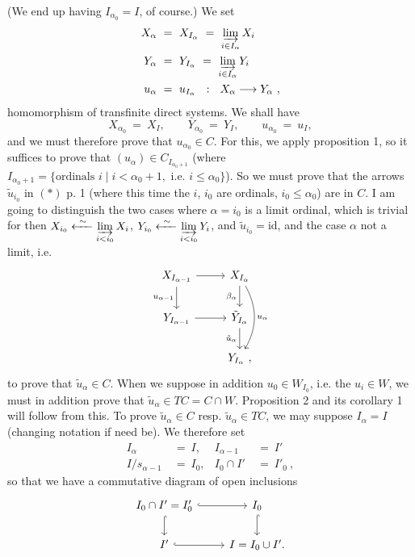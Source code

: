 \documentclass[11pt]{article}
\newcommand{\printedpage}[1]{\marginpar{\footnotesize p.~#1}}
\newcommand{\msp}[1]{\marginpar{\footnotesize [#1]}}
\begin{document}
\msp{page 12}

(We end up having $I_{\alpha_0} = I$, of course.) We set
\[
\begin{aligned}
X_{\alpha} \ &= \ X_{I_{\alpha}} \ = \ \varinjlim_{i \in I_{\alpha}} X_i \\
Y_{\alpha} \ &= \ Y_{I_{\alpha}} \ = \ \varinjlim_{i \in I_{\alpha}} Y_i \\
u_{\alpha} \ &= \ u_{I_{\alpha}} \ \ :\ \ X_{\alpha} \longrightarrow Y_{\alpha}\ ,
\end{aligned}
\]
homomorphism of transfinite direct systems. We shall have
\[
X_{\alpha_0} \ = \ X_I, \qquad Y_{\alpha_0} \ = \ Y_I, \qquad u_{\alpha_0} \ = \ u_I,
\]
and we must therefore prove that $u_{\alpha_0} \in C$. For this, we apply proposition 1, so it suffices to prove that $(u_{\alpha}) \in C_{I_{\alpha_0+1}}$ (where $I_{\alpha_0+1} = \{\text{ordinals } i \mid i < \alpha_0 + 1, \text{ i.e. } i \leq \alpha_0\}$). So we must prove that the arrows $\tilde{u}_{i_0}$ in $(*)$ p. 1 (where this time the $i$, $i_0$ are ordinals, $i_0 \leq \alpha_0$) are in $C$. I am going to distinguish the two cases where $\alpha = i_0$ is a limit ordinal, which is trivial for then $X_{i_0} \xleftarrow{\ \sim\ } \varinjlim\limits_{i < i_0} X_i$, $Y_{i_0} \xleftarrow{\ \sim\ } \varinjlim\limits_{i < i_0} Y_i$, and $\tilde{u}_{i_0} = \mathrm{id}$, and the case $\alpha$ not a limit, i.e.
\[
\begin{tikzcd}
X_{I_{\alpha-1}} \arrow[r] \arrow[d, "u_{\alpha-1}"'] & X_{I_{\alpha}} \arrow[d, "\beta_{\alpha}"'] \arrow[dd, bend left=30, "u_{\alpha}"] \\
Y_{I_{\alpha-1}} \arrow[r] & \tilde{Y}_{I_{\alpha}} \arrow[d, "\tilde{u}_{\alpha}"'] \\
& Y_{I_{\alpha}}\ ,
\end{tikzcd}
\]
\printedpage{8}
\msp{page 13}
to prove that $\tilde{u}_{\alpha} \in C$. When we suppose in addition $u_0 \in W_{I_0}$, i.e. the $u_i \in W$, we must in addition prove that $\tilde{u}_{\alpha} \in TC = C \cap W$. Proposition 2 and its corollary 1 will follow from this. To prove $\tilde{u}_{\alpha} \in C$ resp. $\tilde{u}_{\alpha} \in TC$, we may suppose $I_{\alpha} = I$ (changing notation if need be). We therefore set
\[
\begin{aligned}
I_{\alpha} \ &= \ I, & I_{\alpha-1} \ &= \ I' \\
I/s_{\alpha-1} \ &= \ I_0, & I_0 \cap I' \ &= \ I'_0\ ,
\end{aligned}
\]
so that we have a commutative diagram of open inclusions
\[
\begin{tikzcd}
I_0 \cap I' = I'_0 \arrow[r, hook] \arrow[d, hook] & I_0 \arrow[d, hook] \\
I' \arrow[r, hook] & I = I_0 \cup I'.
\end{tikzcd}
\]
\end{document}
